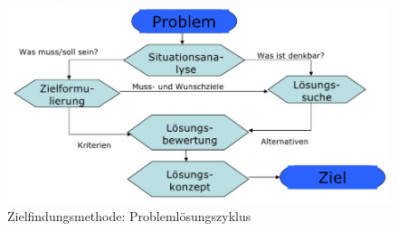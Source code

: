 \documentclass[12pt]{scrartcl}
\begin{document}
\begin{figure}[H]
	\begin{center}
		\includegraphics[width=1.0\textwidth]{img/problemloesungszyklus}
		\caption{Zielfindungsmethode: Problemlösungszyklus}
		\label{probsolcycle}	
	\end{center}
\end{figure}
\end{document}
